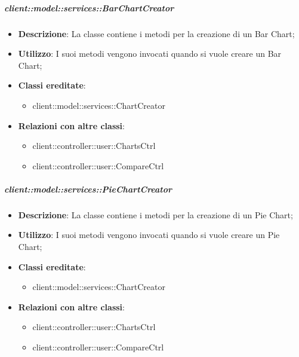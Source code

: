 		\subparagraph{client::model::services::BarChartCreator} %
		\label{subp:barchartcreator}
			\begin{itemize}
				\item \textbf{Descrizione}: La classe contiene i metodi per la creazione di un Bar Chart;
				\item \textbf{Utilizzo}: I suoi metodi vengono invocati quando si vuole creare un Bar Chart;
				\item \textbf{Classi ereditate}:					
					\begin{itemize}
						\item client::model::services::ChartCreator
					\end{itemize}
				\item \textbf{Relazioni con altre classi}:					
					\begin{itemize}
						\item client::controller::user::ChartsCtrl
						\item client::controller::user::CompareCtrl
					\end{itemize}
			\end{itemize}

		\subparagraph{client::model::services::PieChartCreator} %
		\label{subp:piechartcreator}
			\begin{itemize}
				\item \textbf{Descrizione}: La classe contiene i metodi per la creazione di un Pie Chart;
				\item \textbf{Utilizzo}: I suoi metodi vengono invocati quando si vuole creare un Pie Chart;
				\item \textbf{Classi ereditate}:					
					\begin{itemize}
						\item client::model::services::ChartCreator
					\end{itemize}
				\item \textbf{Relazioni con altre classi}:					
					\begin{itemize}
						\item client::controller::user::ChartsCtrl
						\item client::controller::user::CompareCtrl
					\end{itemize}
			\end{itemize}

